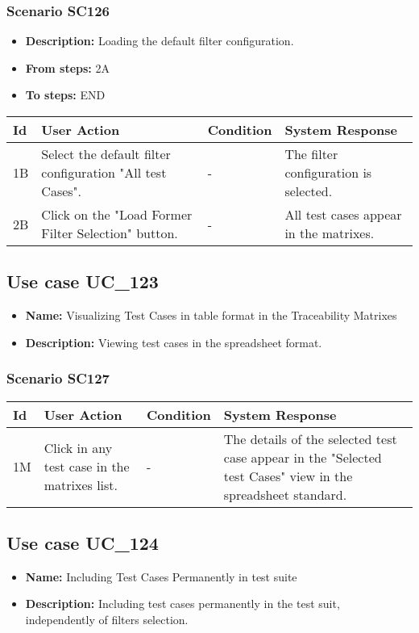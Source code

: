 \documentclass[a4paper,11pt]{article}
\newcommand{\bl}{\\ \hline}
\begin{document}
\subsubsection*{Scenario SC126}
\begin{itemize}
\item {\bf Description:} Loading the default filter configuration.
\item {\bf From steps:} 2A
\item {\bf To steps:} END
\end{itemize}
\begin{tabular}{|p{0.4in}|p{1.5in}|p{1.5in}|p{1.5in}|}
\hline
Id & User Action & Condition & System Response \bl 
1B & Select the default filter configuration "All test Cases".
					 & - & The filter configuration is selected.\bl
2B & Click on the "Load Former Filter Selection" button.
					 & - & All test cases appear in the matrixes.\bl
\end{tabular}
\subsection*{Use case UC_123}
\begin{itemize}
\item {\bf Name: }Visualizing Test Cases in table format in the Traceability
				Matrixes
\item {\bf Description: }Viewing test cases in the spreadsheet format.
			
\end{itemize}
\subsubsection*{Scenario SC127}
\begin{tabular}{|p{0.4in}|p{1.5in}|p{1.5in}|p{1.5in}|}
\hline
Id & User Action & Condition & System Response \bl 
1M & Click in any test case in the matrixes list. & - & The details of the selected test case appear in the
						"Selected test Cases" view in the spreadsheet standard.\bl
\end{tabular}
\subsection*{Use case UC_124}
\begin{itemize}
\item {\bf Name: }Including Test Cases Permanently in test suite
\item {\bf Description: }Including test cases permanently in the test suit,
				independently of filters selection.
\end{itemize}
\end{document}
